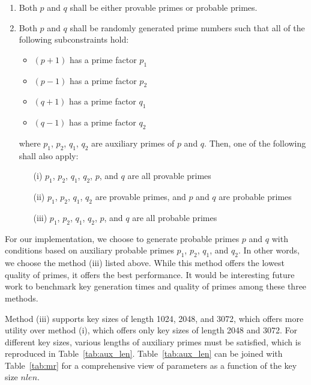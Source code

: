 \documentclass[letterpaper]{article}
\begin{document}
\begin{enumerate}
    \item Both $p$ and $q$ shall be either provable primes or probable primes.

    \item Both $p$ and $q$ shall be randomly generated prime numbers such that all of the following subconstraints hold:

        \begin{itemize}
            \item $(p+1)$ has a prime factor $p_1$
            \item $(p-1)$ has a prime factor $p_2$
            \item $(q+1)$ has a prime factor $q_1$
            \item $(q-1)$ has a prime factor $q_2$
        \end{itemize}

    where $p_1$, $p_2$, $q_1$, $q_2$ are auxiliary primes of $p$ and $q$. Then, one of the following shall also apply:

    \begin{enumerate}
        \item[(i)] $p_1$, $p_2$, $q_1$, $q_2$, $p$, and $q$ are all provable primes

        \item[(ii)] $p_1$, $p_2$, $q_1$, $q_2$ are provable primes, and $p$ and $q$ are probable primes
        \item[(iii)] $p_1$, $p_2$, $q_1$, $q_2$, $p$, and $q$ are all probable primes
    \end{enumerate}
\end{enumerate}

For our implementation, we choose to generate probable primes $p$ and $q$ with conditions based on auxiliary probable primes $p_1$, $p_2$, $q_1$, and $q_2$. In other words, we choose the method (iii) listed above. While this method offers the lowest quality of primes, it offers the best performance. It would be interesting future work to benchmark key generation times and quality of primes among these three methods.

Method (iii) supports key sizes of length 1024, 2048, and 3072, which offers more utility over method (i), which offers only key sizes of length 2048 and 3072. For different key sizes, various lengths of auxiliary primes must be satisfied, which is reproduced in Table~\ref{tab:aux_len}. Table~\ref{tab:aux_len} can be joined with Table~\ref{tab:mr} for a comprehensive view of parameters as a function of the key size $nlen$.
\end{document}
